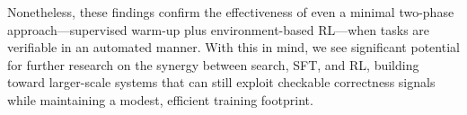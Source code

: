 \documentclass{article}
\begin{document}
Nonetheless, these findings confirm the effectiveness of even a minimal two-phase approach—supervised warm-up plus environment-based RL—when tasks are verifiable in an automated manner. With this in mind, we see significant potential for further research on the synergy between search, SFT, and RL, building toward larger-scale systems that can still exploit checkable correctness signals while maintaining a modest, efficient training footprint.
\end{document}
